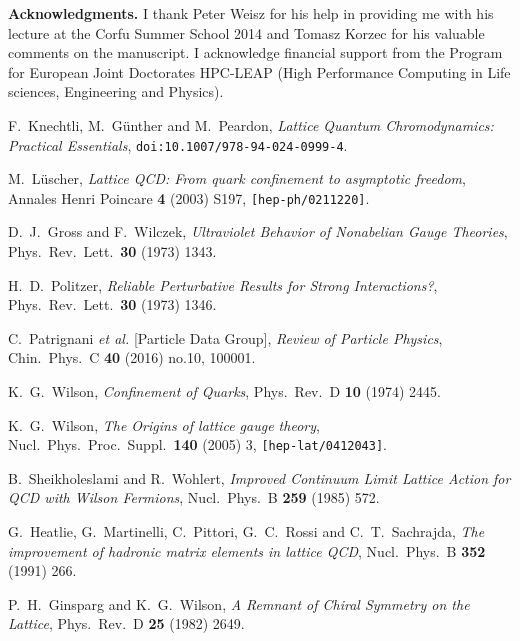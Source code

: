 \documentclass{PoS}
\begin{document}
{\bf Acknowledgments.} I thank Peter Weisz for his help
in providing me with his lecture at the Corfu Summer School 2014
and Tomasz Korzec for his valuable comments on the manuscript.
I acknowledge financial support from the Program for European Joint
Doctorates HPC-LEAP (High Performance Computing in Life sciences,
Engineering and Physics).

\begin{thebibliography}{99}

  F.~Knechtli, M.~G\"unther and M.~Peardon,
  \emph{Lattice Quantum Chromodynamics: Practical Essentials},
  {\tt doi:10.1007/978-94-024-0999-4}.

  M.~L{\"u}scher,
  \emph{Lattice QCD: From quark confinement to asymptotic freedom},
  Annales Henri Poincare {\bf 4} (2003) S197,
  {\tt [hep-ph/0211220]}.

  D.~J.~Gross and F.~Wilczek,
  \emph{Ultraviolet Behavior of Nonabelian Gauge Theories},
  Phys.\ Rev.\ Lett.\  {\bf 30} (1973) 1343.

  H.~D.~Politzer,
  \emph{Reliable Perturbative Results for Strong Interactions?},
  Phys.\ Rev.\ Lett.\  {\bf 30} (1973) 1346.

  C.~Patrignani {\it et al.} [Particle Data Group],
  \emph{Review of Particle Physics},
  Chin.\ Phys.\ C {\bf 40} (2016) no.10,  100001.

  K.~G.~Wilson,
  \emph{Confinement of Quarks},
  Phys.\ Rev.\ D {\bf 10} (1974) 2445.

  K.~G.~Wilson,
  \emph{The Origins of lattice gauge theory},
  Nucl.\ Phys.\ Proc.\ Suppl.\  {\bf 140} (2005) 3,
  {\tt [hep-lat/0412043]}.

  B.~Sheikholeslami and R.~Wohlert,
  \emph{Improved Continuum Limit Lattice Action for QCD with Wilson Fermions},
  Nucl.\ Phys.\ B {\bf 259} (1985) 572.

  G.~Heatlie, G.~Martinelli, C.~Pittori, G.~C.~Rossi and C.~T.~Sachrajda,
  \emph{The improvement of hadronic matrix elements in lattice QCD},
  Nucl.\ Phys.\ B {\bf 352} (1991) 266.

  P.~H.~Ginsparg and K.~G.~Wilson,
  \emph{A Remnant of Chiral Symmetry on the Lattice},
  Phys.\ Rev.\ D {\bf 25} (1982) 2649.


\end{thebibliography}
\end{document}

